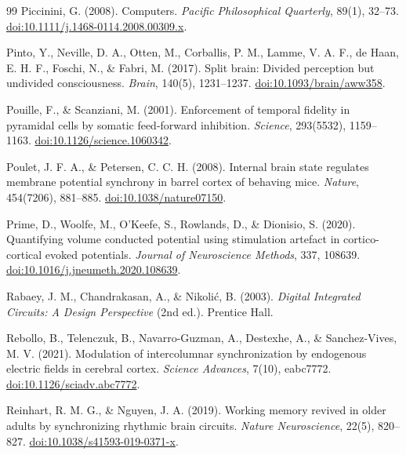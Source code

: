 \begin{thebibliography}{99}
 Piccinini, G. (2008). Computers. \textit{Pacific Philosophical Quarterly}, 89(1), 32--73. \href{https://doi.org/10.1111/j.1468-0114.2008.00309.x}{doi:10.1111/j.1468-0114.2008.00309.x}.

 Pinto, Y., Neville, D. A., Otten, M., Corballis, P. M., Lamme, V. A. F., de Haan, E. H. F., Foschi, N., \& Fabri, M. (2017). Split brain: Divided perception but undivided consciousness. \textit{Brain}, 140(5), 1231--1237. \href{https://doi.org/10.1093/brain/aww358}{doi:10.1093/brain/aww358}.

 Pouille, F., \& Scanziani, M. (2001). Enforcement of temporal fidelity in pyramidal cells by somatic feed-forward inhibition. \textit{Science}, 293(5532), 1159--1163. \href{https://doi.org/10.1126/science.1060342}{doi:10.1126/science.1060342}.

 Poulet, J. F. A., \& Petersen, C. C. H. (2008). Internal brain state regulates membrane potential synchrony in barrel cortex of behaving mice. \textit{Nature}, 454(7206), 881--885. \href{https://doi.org/10.1038/nature07150}{doi:10.1038/nature07150}.

 Prime, D., Woolfe, M., O'Keefe, S., Rowlands, D., \& Dionisio, S. (2020). Quantifying volume conducted potential using stimulation artefact in cortico-cortical evoked potentials. \textit{Journal of Neuroscience Methods}, 337, 108639. \href{https://doi.org/10.1016/j.jneumeth.2020.108639}{doi:10.1016/j.jneumeth.2020.108639}.

 Rabaey, J. M., Chandrakasan, A., \& Nikoli\'{c}, B. (2003). \textit{Digital Integrated Circuits: A Design Perspective} (2nd ed.). Prentice Hall.

 Rebollo, B., Telenczuk, B., Navarro-Guzman, A., Destexhe, A., \& Sanchez-Vives, M. V. (2021). Modulation of intercolumnar synchronization by endogenous electric fields in cerebral cortex. \textit{Science Advances}, 7(10), eabc7772. \href{https://doi.org/10.1126/sciadv.abc7772}{doi:10.1126/sciadv.abc7772}.

 Reinhart, R. M. G., \& Nguyen, J. A. (2019). Working memory revived in older adults by synchronizing rhythmic brain circuits. \textit{Nature Neuroscience}, 22(5), 820--827. \href{https://doi.org/10.1038/s41593-019-0371-x}{doi:10.1038/s41593-019-0371-x}.


\end{thebibliography}

